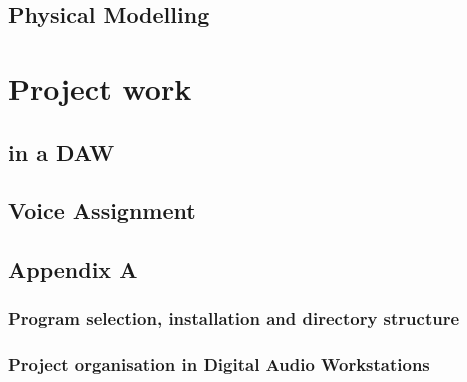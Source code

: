 \documentclass[11pt]{article}
\begin{document}
\subsection{Physical Modelling}
\label{sec:orgee820be}

\section{Project work}
\label{sec:orgb069812}
\subsection{in a DAW}
\label{sec:org1d954e3}
\subsection{Voice Assignment}
\label{sec:org927f3ea}

\subsection{Appendix A}
\label{sec:orgae8010b}
\subsubsection{Program selection, installation and directory structure}
\label{sec:org248eb5d}
\subsubsection{Project organisation in Digital Audio Workstations}
\label{sec:orge53c2aa}
\end{document}
